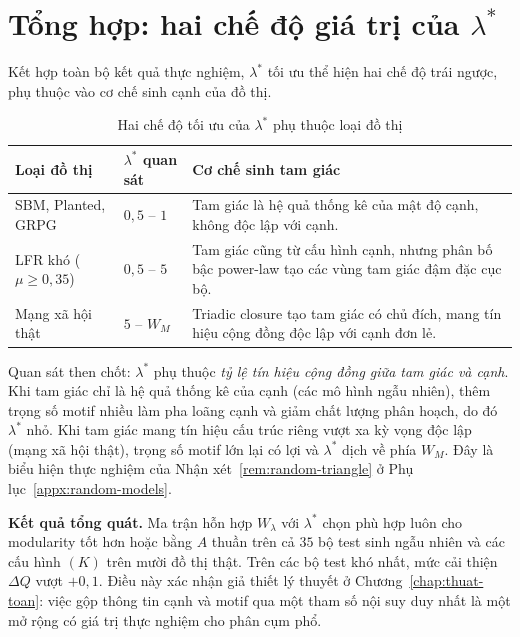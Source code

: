 \section{Tổng hợp: hai chế độ giá trị của $\lambda^*$}
\label{sec:summary-results}

Kết hợp toàn bộ kết quả thực nghiệm, $\lambda^*$ tối ưu thể hiện hai chế độ trái ngược, phụ thuộc vào cơ chế sinh cạnh của đồ thị.

\begin{table}[H]
\centering
\caption{Hai chế độ tối ưu của $\lambda^*$ phụ thuộc loại đồ thị}
\label{tab:two-regimes}
\begin{tabular}{|>{\arraybackslash}p{4cm}|>{\arraybackslash}p{3.5cm}|>{\arraybackslash}p{6cm}|}
\hline
\textbf{Loại đồ thị} & $\lambda^*$ quan sát & \textbf{Cơ chế sinh tam giác} \\ \hline
SBM, Planted, GRPG & $0{,}5$ -- $1$ & Tam giác là hệ quả thống kê của mật độ cạnh, không độc lập với cạnh. \\ \hline
LFR khó ($\mu \geq 0{,}35$) & $0{,}5$ -- $5$ & Tam giác cũng từ cấu hình cạnh, nhưng phân bố bậc power-law tạo các vùng tam giác đậm đặc cục bộ. \\ \hline
Mạng xã hội thật & $5$ -- $W_M$ & Triadic closure tạo tam giác có chủ đích, mang tín hiệu cộng đồng độc lập với cạnh đơn lẻ. \\ \hline
\end{tabular}
\end{table}

Quan sát then chốt: $\lambda^*$ phụ thuộc \emph{tỷ lệ tín hiệu cộng đồng giữa tam giác và cạnh}. Khi tam giác chỉ là hệ quả thống kê của cạnh (các mô hình ngẫu nhiên), thêm trọng số motif nhiều làm pha loãng cạnh và giảm chất lượng phân hoạch, do đó $\lambda^*$ nhỏ. Khi tam giác mang tín hiệu cấu trúc riêng vượt xa kỳ vọng độc lập (mạng xã hội thật), trọng số motif lớn lại có lợi và $\lambda^*$ dịch về phía $W_M$. Đây là biểu hiện thực nghiệm của Nhận xét~\ref{rem:random-triangle} ở Phụ lục~\ref{appx:random-models}.

\textbf{Kết quả tổng quát.} Ma trận hỗn hợp $W_\lambda$ với $\lambda^*$ chọn phù hợp luôn cho modularity tốt hơn hoặc bằng $A$ thuần trên cả $35$ bộ test sinh ngẫu nhiên và các cấu hình $(K)$ trên mười đồ thị thật. Trên các bộ test khó nhất, mức cải thiện $\Delta Q$ vượt $+0{,}1$. Điều này xác nhận giả thiết lý thuyết ở Chương~\ref{chap:thuat-toan}: việc gộp thông tin cạnh và motif qua một tham số nội suy duy nhất là một mở rộng có giá trị thực nghiệm cho phân cụm phổ.

\cleardoublepage
